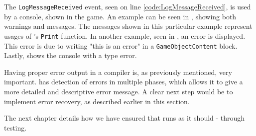 The \texttt{LogMessageReceived} event, seen on line \ref{code:LogMessageReceived}, is used by a console, shown in the \dazel{} game. An example can be seen in , showing both warnings and messages. The messages shown in this particular example represent usages of \dazel{}'s \texttt{Print} function. In another example, seen in , an error is displayed. This error is due to writing "this is an error" in a \texttt{GameObjectContent} block. Lastly,  shows the \dazel{} console with a type error.


Having proper error output in a compiler is, as previously mentioned, very important. \dazel{} has detection of errors in multiple phases, which allows it to give a more detailed and descriptive error message. A clear next step would be to implement error recovery, as described earlier in this section.

The next chapter details how we have ensured that \dazel{} runs as it should - through testing.
